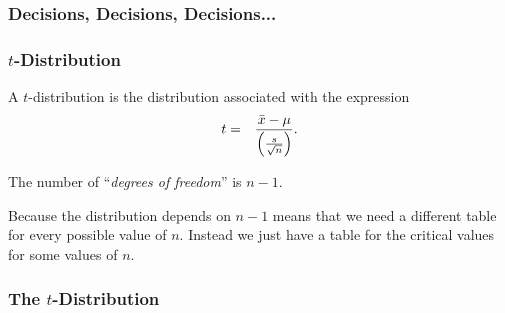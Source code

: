 \begin{frame}
  \frametitle{Decisions, Decisions, Decisions...}

\end{frame}


\begin{frame}
  \frametitle{$t$-Distribution}

  \begin{definition}[$t$-Distribution]

    A $t$-distribution is the distribution associated with the expression
    \begin{eqnarray*}
      t &  = & \frac{\bar{x}-\mu}{\left( \frac{s}{\sqrt{n}} \right)}.
    \end{eqnarray*}

    The number of ``\textit{degrees of freedom}'' is $n-1$.
    
  \end{definition}

  Because the distribution depends on $n-1$ means that we need a
  different table for every possible value of $n$. Instead we just
  have a table for the critical values for some values of $n$.
  

\end{frame}


\begin{frame}
  \frametitle{The $t$-Distribution}

  

\end{frame}


